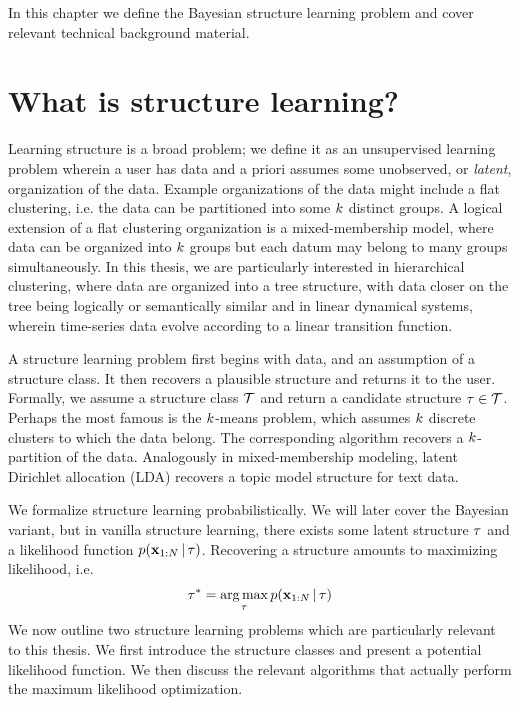 In this chapter we define the Bayesian structure learning problem and cover relevant technical background material.

\section{What is structure learning?}
Learning structure is a broad problem; we define it as an unsupervised learning problem wherein a user has data
and a priori assumes some unobserved, or \emph{latent}, organization of the data. Example organizations of the data might include a flat clustering, i.e. the data can be partitioned into some $k$ distinct groups. A logical extension of a flat clustering organization is a mixed-membership model, where data can be organized into $k$ groups but each datum may belong to many groups simultaneously. 
In this thesis, we are particularly interested in hierarchical clustering, where data are organized into a tree structure, with data closer on the tree being logically or semantically similar and in
linear dynamical systems, wherein time-series data
evolve according to a linear transition function.

A structure learning problem first begins with data, and an assumption of a structure class. It then recovers a plausible structure and returns it to the user. Formally, we assume a structure class $\mathcal{T}$ and return a candidate structure $\tau \in \mathcal{T}$.
Perhaps the most famous is the $k$-means problem, which assumes $k$ discrete clusters to which the data belong. The corresponding algorithm recovers a $k$-partition of the data.  Analogously in mixed-membership modeling, latent Dirichlet allocation (LDA) recovers a topic model structure for text data.

We formalize structure learning probabilistically. We will later cover the Bayesian variant, but in vanilla structure learning,
there exists some latent structure $\tau$
and a likelihood function $p(\mathbf{x}_{1:N} \,|\, \tau)$.
Recovering a structure amounts to
maximizing likelihood, i.e.
\begin{align*}
    \tau^* = \operatorname*{arg\,max}_{\tau} p(\mathbf{x}_{1:N} \,|\, \tau)
\end{align*}
We now outline two structure learning problems
which are particularly relevant to this thesis. We first introduce the structure classes and present a potential likelihood function. We then discuss the relevant
algorithms that actually perform
the maximum likelihood optimization.

